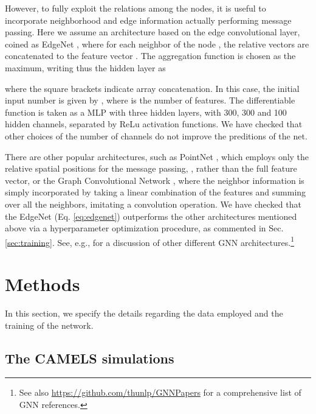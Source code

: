 \documentclass[twocolumn]{aastex631}
\begin{document}
However, to fully exploit the relations among the nodes, it is useful to incorporate neighborhood and edge information actually performing message passing. Here we assume an architecture based on the edge convolutional layer, coined as EdgeNet \citep{wang2019dynamic}, where for each neighbor  of the node , the relative vectors  are concatenated to the feature vector . The aggregation function is chosen as the maximum, writing thus the hidden layer as

where the square brackets indicate array concatenation. In this case, the initial input number is given by , where  is the number of features. The differentiable function  is taken as a MLP with three hidden layers, with 300, 300 and 100 hidden channels, separated by ReLu activation functions. We have checked that other choices of the number of channels do not improve the preditions of the net.

There are other popular architectures, such as PointNet \citep{qi2017pointnet,qi2017pointnet++}, which employs only the relative spatial positions for the message passing, , rather than the full feature vector, or the Graph Convolutional Network \citep{kipf2017semisupervised}, where the neighbor information is simply incorporated by taking a linear combination of the features and summing over all the neighbors, imitating a convolution operation. We have checked that the EdgeNet (Eq. \ref{eq:edgenet}) outperforms the other architectures mentioned above via a hyperparameter optimization procedure, as commented in Sec. \ref{sec:training}. See, e.g., \cite{2019arXiv190100596W, 2018arXiv181208434Z} for a discussion of other different GNN architectures.\footnote{See also \url{https://github.com/thunlp/GNNPapers} for a comprehensive list of GNN references.}


\section{Methods}

\label{sec:methods}




In this section, we specify the details regarding the data employed and the training of the network. 

\subsection{The CAMELS simulations}
\label{sec:camels}
\end{document}
